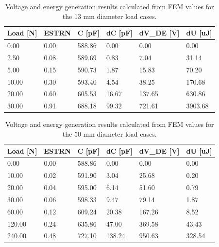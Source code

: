 \begin{table}[H]
	\centering
	\caption{Voltage and energy generation results calculated from FEM values for the 13 mm diameter load cases.}
	\label{tab:volt-energy-gen-d13mm}
	\vspace{0.3cm}
	\begin{tabular}{llllll}
		\textbf{Load {[}N{]}} & \textbf{ESTRN} & \textbf{C {[}pF{]}} & \textbf{dC {[}pF{]}} & \textbf{dV\_DE {[}V{]}} & \textbf{dU {[}uJ{]}} \\ \hline
		0.00  & 0.00 & 588.86 & 0.00  & 0.00   & 0.00    \\
		2.50  & 0.08 & 589.69 & 0.83  & 7.04   & 31.14   \\
		5.00  & 0.15 & 590.73 & 1.87  & 15.83  & 70.20   \\
		10.00 & 0.30 & 593.40 & 4.54  & 38.25  & 170.68  \\
		20.00 & 0.60 & 605.53 & 16.67 & 137.65 & 630.86  \\
		30.00 & 0.91 & 688.18 & 99.32 & 721.61 & 3903.68
	\end{tabular}
\end{table}

\begin{table}[H]
	\centering
	\caption{Voltage and energy generation results calculated from FEM values for the 50 mm diameter load cases.}
	\label{tab:volt-energy-gen-50mm}
	\vspace{0.3cm}
	\begin{tabular}{llllll}
		\textbf{Load {[}N{]}} & \textbf{ESTRN} & \textbf{C {[}pF{]}} & \textbf{dC {[}pF{]}} & \textbf{dV\_DE {[}V{]}} & \textbf{dU {[}uJ{]}} \\ \hline
		0.00 & 0.00 & 588.86 & 0.00 & 0.00 & 0.00 \\
		10.00 & 0.02 & 591.90 & 3.04 & 25.68 & 0.20 \\
		20.00 & 0.04 & 595.00 & 6.14 & 51.60 & 0.79 \\
		30.00 & 0.06 & 598.33 & 9.47 & 79.14 & 1.87 \\
		60.00 & 0.12 & 609.24 & 20.38 & 167.26 & 8.52 \\
		120.00 & 0.24 & 635.86 & 47.00 & 369.58 & 43.43 \\
		240.00 & 0.48 & 727.10 & 138.24 & 950.63 & 328.54
	\end{tabular}
\end{table}

